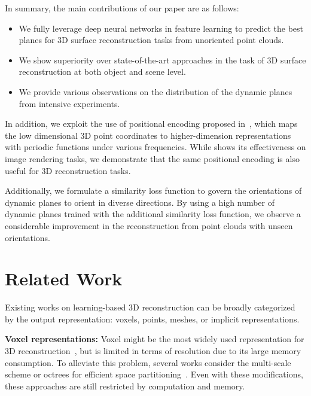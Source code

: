 \documentclass[10pt,twocolumn,letterpaper]{article}
\begin{document}
In summary, the main contributions of our paper are as follows:
\begin{itemize}
    \item We fully leverage deep neural networks in feature learning to predict the best planes for 3D surface reconstruction tasks from unoriented point clouds. 
    \item We show superiority over state-of-the-art approaches in the task of 3D surface reconstruction at both object and scene level.
    \item We provide various observations on the distribution of the dynamic planes from intensive experiments.
\end{itemize}

In addition, we exploit the use of positional encoding proposed in~\cite{mildenhall2020nerf}, which maps the low dimensional 3D point coordinates to higher-dimension representations with periodic functions under various frequencies. While \cite{mildenhall2020nerf} shows its effectiveness on image rendering tasks, we demonstrate that the same positional encoding is also useful for 3D reconstruction tasks. 

Additionally, we formulate a similarity loss function to govern the orientations of dynamic planes to orient in diverse directions. By using a high number of dynamic planes trained with the additional similarity loss function, we observe a considerable improvement in the reconstruction from point clouds with unseen orientations.

\section{Related Work}\label{sec:related_work}
\par
Existing works on learning-based 3D reconstruction can be broadly categorized by the output representation: voxels, points, meshes, or implicit representations.

\textbf{Voxel representations:} 
Voxel might be the most widely used representation for 3D reconstruction~\cite{choy20163d, wu2016learning, wu20153d}, but is limited in terms of resolution due to its large memory consumption. To alleviate this problem, several works consider the multi-scale scheme or octrees for efficient space partitioning~\cite{dai2017shape,hane2017hierarchical, maturana2015voxnet}. Even with these modifications, these approaches are still restricted by computation and memory.
\end{document}
